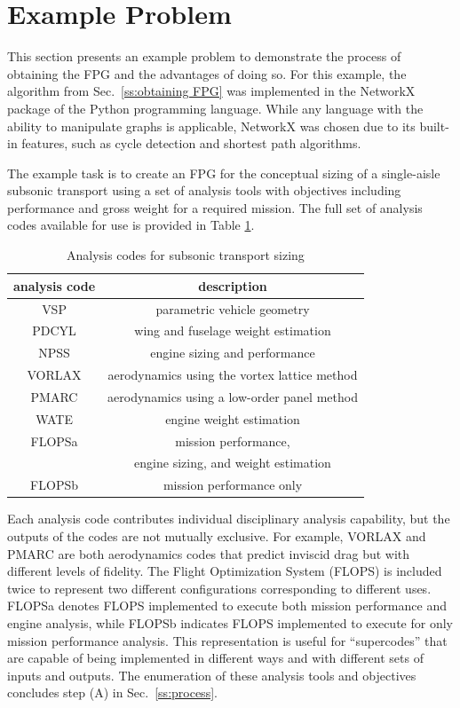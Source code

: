 \section{Example Problem}
	\label{s:example problem}
	This section presents an example problem to demonstrate the process of obtaining the FPG and the advantages of doing so. 
	For this example, the algorithm from Sec.~\ref{ss:obtaining FPG} was implemented in the NetworkX package of the Python programming language. 
	While any language with the ability to manipulate graphs is applicable, NetworkX was chosen due to its built-in features, such as cycle detection and shortest path algorithms.

	The example task is to create an FPG for the conceptual sizing of a single-aisle subsonic transport using a set of analysis tools with objectives including performance and gross weight for a required mission. 
	The full set of analysis codes available for use is provided in Table \ref{t:analysis codes}.
	\begin{table}[htbp]
	  \centering
	  \caption{Analysis codes for subsonic transport sizing}
		\begin{tabular}{cc}
		\toprule
		analysis code & description \\
		\midrule
		VSP   & parametric vehicle geometry \\
		PDCYL & wing and fuselage weight estimation \\
		NPSS  & engine sizing and performance \\
		VORLAX & aerodynamics using the vortex lattice method \\
		PMARC & aerodynamics using a low-order panel method \\
		WATE  & engine weight estimation \\
		FLOPSa & mission performance, \\
		  & engine sizing, and weight estimation \\
		FLOPSb & mission performance only \\
		\bottomrule
		\end{tabular}%
	  \label{t:analysis codes}%
	\end{table}%
	Each analysis code contributes individual disciplinary analysis capability, but the outputs of the codes are not mutually exclusive. 
	For example, VORLAX and PMARC are both aerodynamics codes that predict inviscid drag but with different levels of fidelity. 
	The Flight Optimization System (FLOPS) is included twice to represent two different configurations corresponding to different uses. 
	FLOPSa denotes FLOPS implemented to execute both mission performance and engine analysis, while FLOPSb indicates  FLOPS implemented to execute for only mission performance analysis. 
	This representation is useful for ``supercodes'' that are capable of being implemented in different ways and with different sets of inputs and outputs.
The enumeration of these analysis tools and objectives concludes step (A) in Sec.~\ref{ss:process}.

